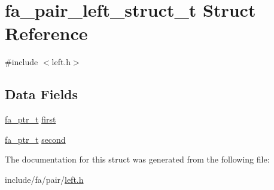 \hypertarget{structfa__pair__left__struct__t}{\section{fa\-\_\-pair\-\_\-left\-\_\-struct\-\_\-t Struct Reference}
\label{structfa__pair__left__struct__t}
}


{\ttfamily \#include $<$left.\-h$>$}

\subsection*{Data Fields}
\begin{DoxyCompactItemize}
\item 
\hyperlink{group___fa_ga915ddeae99ad7568b273d2b876425197}{fa\-\_\-ptr\-\_\-t} \hyperlink{group___fa_pair_ga0126e5e7ae0be3ffee37b0a6fbebc661}{first}
\item 
\hyperlink{group___fa_ga915ddeae99ad7568b273d2b876425197}{fa\-\_\-ptr\-\_\-t} \hyperlink{group___fa_pair_gaf7eeba2af202d717999b5abfa302006b}{second}
\end{DoxyCompactItemize}


The documentation for this struct was generated from the following file\-:\begin{DoxyCompactItemize}
\item 
include/fa/pair/\hyperlink{left_8h}{left.\-h}\end{DoxyCompactItemize}

